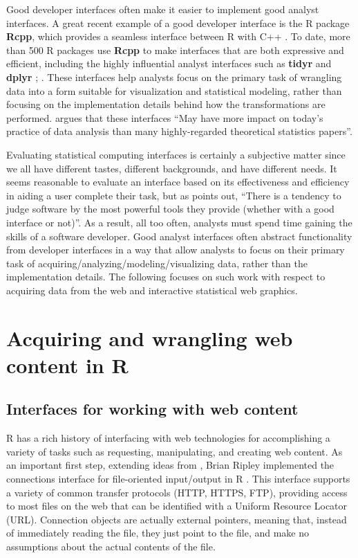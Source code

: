 \documentclass[11pt]{isuthesis}
\begin{document}
Good developer interfaces often make it easier to implement good analyst
interfaces. A great recent example of a good developer interface is the
R package \textbf{Rcpp}, which provides a seamless interface between R
with C++ \citep{Rcpp}. To date, more than 500 R packages use
\textbf{Rcpp} to make interfaces that are both expressive and efficient,
including the highly influential analyst interfaces such as
\textbf{tidyr} and \textbf{dplyr} \citep{tidy-data}; \citep{dplyr}.
These interfaces help analysts focus on the primary task of wrangling
data into a form suitable for visualization and statistical modeling,
rather than focusing on the implementation details behind how the
transformations are performed. \citep{Donoho:2015tu} argues that these
interfaces ``May have more impact on today's practice of data analysis
than many highly-regarded theoretical statistics papers''.

Evaluating statistical computing interfaces is certainly a subjective
matter since we all have different tastes, different backgrounds, and
have different needs. It seems reasonable to evaluate an interface based
on its effectiveness and efficiency in aiding a user complete their
task, but as \citep{Unwin:1999vp} points out, ``There is a tendency to
judge software by the most powerful tools they provide (whether with a
good interface or not)''. As a result, all too often, analysts must
spend time gaining the skills of a software developer. Good analyst
interfaces often abstract functionality from developer interfaces in a
way that allow analysts to focus on their primary task of
acquiring/analyzing/modeling/visualizing data, rather than the
implementation details. The following focuses on such work with respect
to acquiring data from the web and interactive statistical web graphics.

\section{Acquiring and wrangling web content in
R}\label{acquiring-and-wrangling-web-content-in-r}

\subsection{Interfaces for working with web
content}\label{interfaces-for-working-with-web-content}

R has a rich history of interfacing with web technologies for
accomplishing a variety of tasks such as requesting, manipulating, and
creating web content. As an important first step, extending ideas from
\citep{Chambers:1999}, Brian Ripley implemented the connections
interface for file-oriented input/output in R \citep{Connections}. This
interface supports a variety of common transfer protocols (HTTP, HTTPS,
FTP), providing access to most files on the web that can be identified
with a Uniform Resource Locator (URL). Connection objects are actually
external pointers, meaning that, instead of immediately reading the
file, they just point to the file, and make no assumptions about the
actual contents of the file.
\end{document}
